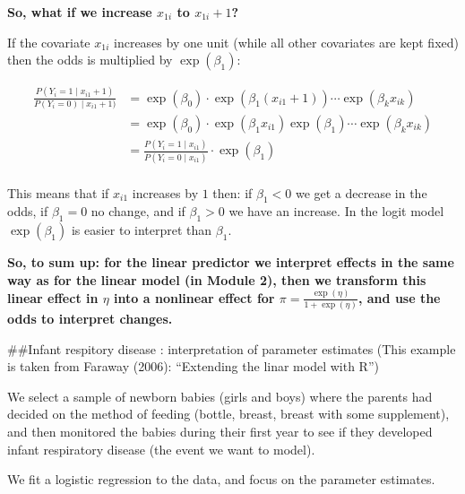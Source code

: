 \documentclass[
  ignorenonframetext,
]{beamer}
\begin{document}
\begin{frame}
\textbf{So, what if we increase \(x_{1i}\) to \(x_{1i}+1\)?}

If the covariate \(x_{1i}\) increases by one unit (while all other
covariates are kept fixed) then the odds is multiplied by
\(\exp(\beta_1)\):

\begin{align*}
\frac{P(Y_i=1\mid x_{i1}+1)}{P(Y_i=0)\mid x_{i1}+1)}&=\exp(\beta_0)\cdot \exp(\beta_1 (x_{i1}+1))\cdots\exp(\beta_k x_{ik})\\
&=\exp(\beta_0)\cdot \exp(\beta_1 x_{i1})\exp(\beta_1)\cdots\exp(\beta_k x_{ik})\\
&=\frac{P(Y_i=1\mid x_{i1})}{P(Y_i=0\mid x_{i1})}\cdot \exp(\beta_1)\\
\end{align*}

This means that if \(x_{i1}\) increases by \(1\) then: if \(\beta_1<0\)
we get a decrease in the odds, if \(\beta_1=0\) no change, and if
\(\beta_1>0\) we have an increase. In the logit model \(\exp(\beta_1)\)
is easier to interpret than \(\beta_1\).
\end{frame}

\begin{frame}
\textbf{So, to sum up: for the linear predictor we interpret effects in
the same way as for the linear model (in Module 2), then we transform
this linear effect in \(\eta\) into a nonlinear effect for
\(\pi=\frac{\exp(\eta)}{1+\exp(\eta)}\), and use the odds to interpret
changes.}
\end{frame}

\begin{frame}
\#\#Infant respitory disease : interpretation of parameter estimates
(This example is taken from Faraway (2006): ``Extending the linar model
with R'')

We select a sample of newborn babies (girls and boys) where the parents
had decided on the method of feeding (bottle, breast, breast with some
supplement), and then monitored the babies during their first year to
see if they developed infant respiratory disease (the event we want to
model).

We fit a logistic regression to the data, and focus on the parameter
estimates.
\end{frame}
\end{document}
